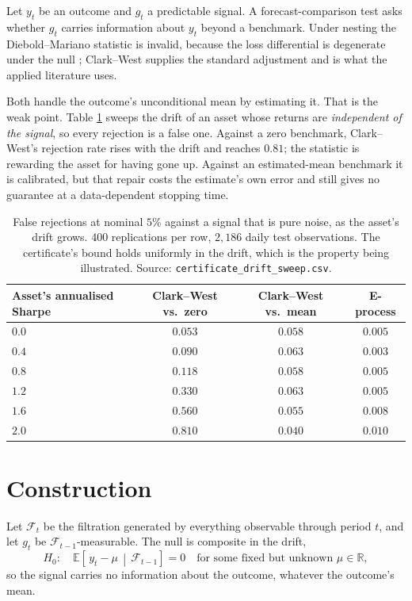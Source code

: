 \documentclass{article}
\begin{document}
Let $y_t$ be an outcome and $g_t$ a predictable signal. A forecast-comparison test asks whether
$g_t$ carries information about $y_t$ beyond a benchmark. Under nesting the Diebold--Mariano
statistic is invalid, because the loss differential is degenerate under the null
\citep{clark2001}; Clark--West \citep{clark2007} supplies the standard adjustment and is what
the applied literature uses.

Both handle the outcome's unconditional mean by estimating it. That is the weak point. Table
\ref{tab:drift} sweeps the drift of an asset whose returns are \emph{independent of the
signal}, so every rejection is a false one. Against a zero benchmark, Clark--West's rejection
rate rises with the drift and reaches $0.81$; the statistic is rewarding the asset for having
gone up. Against an estimated-mean benchmark it is calibrated, but that repair costs the
estimate's own error and still gives no guarantee at a data-dependent stopping time.

\begin{table}[h]
  \centering
  \caption{False rejections at nominal $5\%$ against a signal that is pure noise, as the
  asset's drift grows. $400$ replications per row, $2{,}186$ daily test observations. The certificate's
  bound holds uniformly in the drift, which is the property being illustrated. Source:
  \texttt{certificate\_drift\_sweep.csv}.}
  \label{tab:drift}
  \small
  \begin{tabular}{lccc}
    \toprule
    Asset's annualised Sharpe & Clark--West vs.\ zero & Clark--West vs.\ mean & E-process \\
    \midrule
    $0.0$ & $0.053$ & $0.058$ & $0.005$ \\
    $0.4$ & $0.090$ & $0.063$ & $0.003$ \\
    $0.8$ & $0.118$ & $0.058$ & $0.005$ \\
    $1.2$ & $0.330$ & $0.063$ & $0.005$ \\
    $1.6$ & $0.560$ & $0.055$ & $0.008$ \\
    $2.0$ & $\mathbf{0.810}$ & $0.040$ & $0.010$ \\
    \bottomrule
  \end{tabular}
\end{table}

\section{Construction}

Let $\mathcal{F}_t$ be the filtration generated by everything observable through period $t$,
and let $g_t$ be $\mathcal{F}_{t-1}$-measurable. The null is composite in the drift,
\[
  H_0:\quad \mathbb{E}\!\left[\,y_t-\mu \,\middle|\, \mathcal{F}_{t-1}\right]=0
  \quad\text{for some fixed but unknown } \mu\in\mathbb{R},
\]
so the signal carries no information about the outcome, whatever the outcome's mean.
\end{document}

